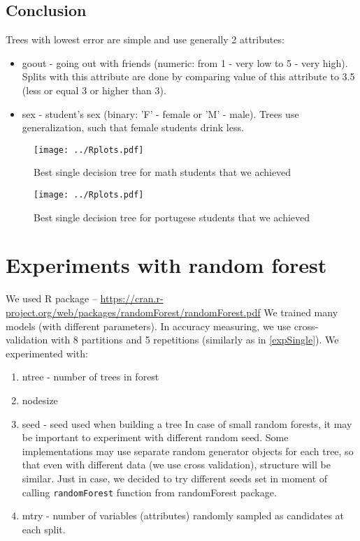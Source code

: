 \documentclass[a4paper]{article}
\begin{document}
\subsection{Conclusion}
\label{singleConc}
Trees with lowest error are simple and use generally 2 attributes:
\begin{itemize}
    \item goout - going out with friends (numeric: from 1 - very low to 5 - very high).
        Splits with this attribute are done by comparing value of this attribute to 3.5
        (less or equal 3 or higher than 3).
    \item sex - student's sex (binary: 'F' - female or 'M' - male).
        Trees use generalization, such that female students drink less.
\end{itemize}





\begin{figure}[]
    \caption[]{Best single decision tree for math students that we achieved}
    \centering
    \texttt{[image: ../Rplots.pdf]}
    \label{fig:single1}
\end{figure}

\begin{figure}[]
    \caption[]{Best single decision tree for portugese students that we achieved}
    \centering
    \texttt{[image: ../Rplots.pdf]}
    \label{fig:single2}
\end{figure}


\newpage
\section{Experiments with random forest}
We used R package -- \url{https://cran.r-project.org/web/packages/randomForest/randomForest.pdf}
We trained many models (with different parameters).
In accuracy measuring, we use cross-validation with 8 partitions
and 5 repetitions (similarly as in \ref{expSingle}).
We experimented with:
\begin{enumerate}
    \item ntree - number of trees in forest
    \item nodesize
    \item seed - seed used when building a tree
            In case of small random forests, it may be important to experiment with different random seed.
            Some implementations may use separate random generator objects for each tree, so that
            even with different data (we use cross validation), structure will be similar.
            Just in case, we decided to try different seeds set in moment of calling \texttt{randomForest}
            function from randomForest package.
    \item mtry - number of variables (attributes) randomly sampled as candidates at each split.
\end{enumerate}
\end{document}
